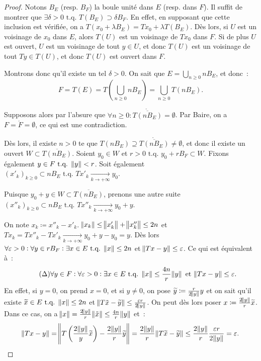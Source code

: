\documentclass{report}
\newcommand{\tq}{\text{ t.q. }}
\newcommand{\st}{\tq}
\newcommand{\pinfty}{{+\infty}}
\theoremstyle{definition}
\theoremstyle{remark}
\begin{document}
\begin{proof} Notons $B_E$ (resp. $B_F$) la boule unité dans $E$ (resp. dans $F$). Il suffit de montrer que $\exists \delta > 0 \st T(B_E) \supset \delta B_F$.
En effet, en supposant que cette inclusion est vérifiée, on a $T(x_0 + \lambda B_E) = Tx_0 + \lambda T(B_E)$. Dès lors, si $U$ est un voisinage de $x_0$ dans $E$,
alors $T(U)$ est un voisinage de $Tx_0$ dans $F$. Si de plus $U$ est ouvert, $U$ est un voisinage de tout $y \in U$, et donc $T(U)$ est un voisinage de tout $Ty \in T(U)$,
et donc $T(U)$ est ouvert dans $F$.

Montrons donc qu'il existe un tel $\delta > 0$. On sait que $E = \bigcup_{n \geq 0}n B_E$, et donc~:
\[F = T(E) = T\left(\bigcup_{n \geq 0}n B_E\right) = \bigcup_{n \geq 0}T(n B_E).\]

Supposons alors par l'absure que $\forall n \geq 0 : \mathring {\overline {T(nB_E)}} = \emptyset$. Par Baire, on a $F = \mathring F = \emptyset$, ce qui est une contradiction.

Dès lors, il existe $n > 0$ te que $T(nB_E) \supseteq \mathring {\overline {T(nB_E)}} \neq \emptyset$, et donc il existe un ouvert $W \subset \overline {T(nB_E)}$. Soient $y_0 \in W$
et $r > 0 \st y_0 + rB_F \subset W$. Fixons également $y \in F \st \norm y < r$. Soit également $(x'_k)_{k \geq 0} \subset nB_E \st Tx'_k \xrightarrow[k \to \pinfty]{} y_0$.

Puisque $y_0+y \in W \subset \overline {T(nB_E)}$, prenons une autre suite $(x''_k)_{k \geq 0} \subset nB_E \st Tx''_k \xrightarrow[k \to \pinfty]{} y_0+y$.

On note $x_k \coloneqq x''_k - x'_k$. $\norm {x_k} \leq \norm {x'_k} + \norm {x''_k} \leq 2n$ et $Tx_k = Tx''_k - Tx'_k \xrightarrow[k \to \pinfty]{} y_0+y-y_0 = y$.
Dès lors $\forall \varepsilon > 0 : \forall y \in rB_F : \exists x \in E \st \norm x \leq 2n$ et $\norm {Tx-y} \leq \varepsilon$. Ce qui est équivalent à~:
\begin{equation}\tag{$\Delta$}\label{eq:Delta}
	\forall y \in F : \forall \varepsilon > 0 : \exists x \in E \st \norm x \leq \frac {4n}r\norm y \text{ et } \norm {Tx - y} \leq \varepsilon.
\end{equation}
En effet, si $y = 0$, on prend $x=0$, et si $y \neq 0$, on pose $\widetilde y \coloneqq \frac r{2\norm y}y$ et on sait qu'il existe
$\widetilde x \in E \st \norm x \leq 2n$ et $\norm {T\tilde x - \widetilde y} \leq \frac {\varepsilon r}{2\norm y}$. On peut dès lors poser $x \coloneqq \frac {2\norm y}r\widetilde x$.
Dans ce cas, on a $\norm x = \frac {2\norm y}r\norm {\tilde x} \leq \frac {4n}r\norm y$ et~:
\[\norm {Tx-y} = \norm {T\left(\frac {2\norm y}y\widetilde x\right) - \frac {2\norm y}r\widetilde y} = \frac {2\norm y}r\norm {T\widetilde x - \widetilde y}
\leq \frac {2\norm y}r\frac {\varepsilon r}{2\norm y} = \varepsilon.\]


\end{proof}
\end{document}

